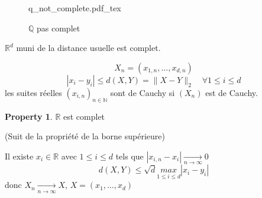\documentclass[a4paper]{report}
\newcommand\N{\ensuremath{\mathbb{N}}}
\newcommand\R{\ensuremath{\mathbb{R}}}
\newcommand\Q{\ensuremath{\mathbb{Q}}}
\theoremstyle{definition}
\newtheorem*{property}{Property}
\newcommand{\incfig}[1]{%
    \def\svgwidth{\columnwidth}
    {#1.pdf_tex}
}
\begin{document}
\begin{figure}[H]
    \centering
    \incfig{q_not_complete}
    \caption{$\Q$ pas complet}
    \label{fig:q_not_complete}
\end{figure}
\begin{prop}\label{prop:rd-est-complet}
   $\R^d$ muni de la distance usuelle est complet. 
\end{prop}
\begin{preuve}
   \[
   X_n = (x_{1,n}, \ldots, x_{d,n})
   \]  
   \[
   |x_i - y_i| \le d(X, Y) = \|X - Y\|_2 \quad \forall 1 \le i \le d
   \] 
   les suites réelles $(x_{i,n})_{n \in \N}$ sont de Cauchy si $(X_n)$ est de Cauchy.
\end{preuve}
\begin{property}
   $\R$ est complet 
\end{property}
\begin{preuve}
    (Suit de la propriété de la borne supérieure) 
    \par
    Il existe $x_i \in \R$ avec $1 \le i \le d$ tels que $|x_{i,n} - x_{i}| \xrightarrow[n \to \infty]{} 0$
    \[
        d(X, Y) \le \sqrt{d} \underset{1 \le i \le d}{max} |x_i - y_i| 
    \] 
    donc $X_n \xrightarrow[n \to \infty]{} X$, $X = (x_1, \ldots, x_d)$
\end{preuve}
\end{document}
